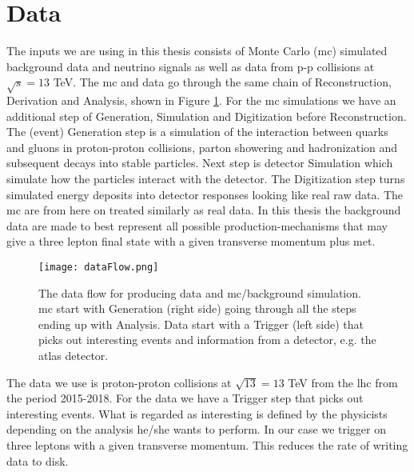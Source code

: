 \documentclass[a4paper, american, 12pt]{report}
\begin{document}
	\section{Data}
	\label{sect:Method-Data}
	The inputs we are using in this thesis consists of Monte Carlo (\acrshort{mc}) simulated background data and neutrino signals as well as data from p-p collisions at $\sqrt{s}=13$ TeV. The \acrshort{mc} and data go through the same chain of Reconstruction, Derivation and Analysis, shown in Figure \ref{fig:DataFlow}. For the \acrshort{mc} simulations we have an additional step of Generation, Simulation and Digitization before Reconstruction. The (event) Generation step is a simulation of the interaction between quarks and gluons in proton-proton collisions, parton showering and hadronization and subsequent decays into stable particles. Next step is detector Simulation which simulate how the particles interact with the detector. The Digitization step turns simulated energy deposits into detector responses looking like real raw data. The \acrshort{mc} are from here on treated similarly as real data. In this thesis the background data are made to best represent all possible production-mechanisms that may give a three lepton final state with a given transverse momentum plus \acrshort{met}.
	\begin{figure}[htb!]
		\hspace*{-0.8cm}
		\centering\texttt{[image: dataFlow.png]}
		\caption[Data flow for producing data and \acrshort{mc}.]{The data flow for producing data and \acrshort{mc}/background simulation. \acrshort{mc} start with Generation (right side) going through all the steps ending up with Analysis. Data start with a Trigger (left side) that picks out interesting events and information from a detector, e.g. the \acrshort{atlas} detector. \label{fig:DataFlow}}
	\end{figure}

	The data we use is proton-proton collisions at $\sqrt{13}=13$ TeV from the \acrshort{lhc} from the period 2015-2018. For the data we have a Trigger step that picks out interesting events. What is regarded as interesting is defined by the physicists depending on the analysis he/she wants to perform. In our case we trigger on three leptons with a given transverse momentum. This reduces the rate of writing data to disk. 
	
\end{document}
